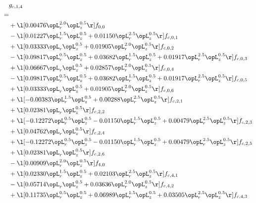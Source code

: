 \begin{alignat}{2} 
\label{eq:g_14_0} 
& g_{c,1,4} \nonumber \\ 
 = \\ 
& + \l[  0.00476 \opL_r^{2.0} \opL_z^{0.5}  \r] f_{0,0} \nonumber \\ 
& - \l[  0.01227 \opL_r^{1.5} \opL_z^{0.5} +  0.01150 \opL_r^{2.5} \opL_z^{0.5}  \r] f_{c,0,1} \nonumber \\ 
& + \l[  0.03333 \opL_r \opL_z^{0.5} +  0.01905 \opL_r^{2.0} \opL_z^{0.5}  \r] f_{c,0,2} \nonumber \\ 
& - \l[  0.09817 \opL_r^{0.5} \opL_z^{0.5} +  0.03682 \opL_r^{1.5} \opL_z^{0.5} +  0.01917 \opL_r^{2.5} \opL_z^{0.5}  \r] f_{c,0,3} \nonumber \\ 
& + \l[  0.06667 \opL_r \opL_z^{0.5} +  0.02857 \opL_r^{2.0} \opL_z^{0.5}  \r] f_{c,0,4} \nonumber \\ 
& - \l[  0.09817 \opL_r^{0.5} \opL_z^{0.5} +  0.03682 \opL_r^{1.5} \opL_z^{0.5} +  0.01917 \opL_r^{2.5} \opL_z^{0.5}  \r] f_{c,0,5} \nonumber \\ 
& + \l[  0.03333 \opL_r \opL_z^{0.5} +  0.01905 \opL_r^{2.0} \opL_z^{0.5}  \r] f_{c,0,6} \nonumber \\ 
& + \l[  -0.00383 \opL_r^{1.5} \opL_z^{0.5} +  0.00288 \opL_r^{2.5} \opL_z^{0.5}  \r] f_{c,2,1} \nonumber \\ 
& + \l[  0.02381 \opL_r \opL_z^{0.5}  \r] f_{c,2,2} \nonumber \\ 
& + \l[  -0.12272 \opL_r^{0.5} \opL_z^{0.5}   -0.01150 \opL_r^{1.5} \opL_z^{0.5} +  0.00479 \opL_r^{2.5} \opL_z^{0.5}  \r] f_{c,2,3} \nonumber \\ 
& + \l[  0.04762 \opL_r \opL_z^{0.5}  \r] f_{c,2,4} \nonumber \\ 
& + \l[  -0.12272 \opL_r^{0.5} \opL_z^{0.5}   -0.01150 \opL_r^{1.5} \opL_z^{0.5} +  0.00479 \opL_r^{2.5} \opL_z^{0.5}  \r] f_{c,2,5} \nonumber \\ 
& + \l[  0.02381 \opL_r \opL_z^{0.5}  \r] f_{c,2,6} \nonumber \\ 
& - \l[  0.00909 \opL_r^{2.0} \opL_z^{0.5}  \r] f_{4,0} \nonumber \\ 
& + \l[  0.02330 \opL_r^{1.5} \opL_z^{0.5} +  0.02103 \opL_r^{2.5} \opL_z^{0.5}  \r] f_{c,4,1} \nonumber \\ 
& - \l[  0.05714 \opL_r \opL_z^{0.5} +  0.03636 \opL_r^{2.0} \opL_z^{0.5}  \r] f_{c,4,2} \nonumber \\ 
& + \l[  0.11735 \opL_r^{0.5} \opL_z^{0.5} +  0.06989 \opL_r^{1.5} \opL_z^{0.5} +  0.03505 \opL_r^{2.5} \opL_z^{0.5}  \r] f_{c,4,3} \nonumber \\ 

\end{alignat}

